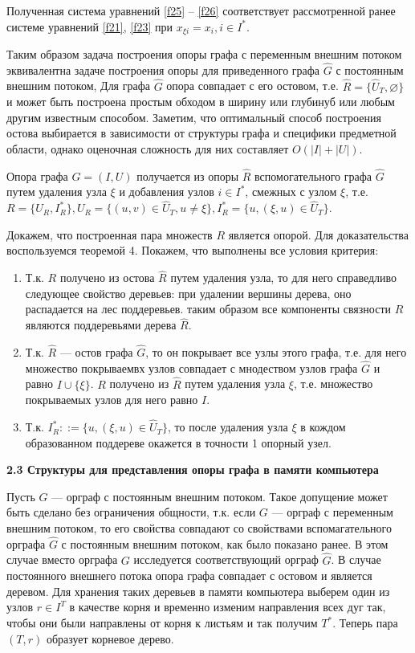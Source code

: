 \documentclass[14pt]{extarticle}%
\begin{document}
Полученная система уравнений \eqref{f25} -- \eqref{f26} соответствует рассмотренной ранее системе уравнений \eqref{f21}, \eqref{f23} при $x_{\xi i}=x_i, i\in I^*$.

Таким образом задача построения опоры графа с переменным внешним потоком эквивалентна задаче построения опоры для приведенного графа $\widehat{G}$ с постоянным внешним потоком, Для графа $\widehat{G}$ опора совпадает с его остовом, т.е. $\widehat{R}=\{\widehat{U}_T,\varnothing\}$ и может быть построена простым обходом в ширину или глубинуб или любым другим известным способом. Заметим, что оптимальный способ построения остова выбирается в зависимости от структуры графа и специфики предметной области, однако оценочная сложность для них составляет $O(|I|+|U|)$.

Опора графа $G=(I,U)$ получается из опоры $\widehat{R}$ вспомогательного графа $\widehat{G}$ путем удаления узла $\xi$ и добавления узлов $i\in I^*$, смежных с узлом $\xi$, т.е. $R=\{U_R, I^*_R\}, U_R=\{(u,v)\in \widehat{U}_T,u\neq \xi\}, I^*_R=\{u,(\xi,u)\in \widehat{U}_T\}$.

Докажем, что построенная пара множеств $R$ является опорой. Для доказательства воспользуемся теоремой 4. Покажем, что выполнены все условия критерия:
\begin{enumerate}
 \item Т.к. $R$ получено из остова $\widehat{R}$ путем удаления узла, то для него справедливо следующее свойство деревьев: при удалении вершины дерева, оно распадается на лес поддеревьев. таким образом все компоненты связности $R$ являются поддеревьями дерева $\widehat{R}$.
 \item Т.к. $\widehat{R}$ --- остов графа $\widehat{G}$, то он покрывает все узлы этого графа, т.е. для него множество покрываемвх узлов совпадает с мнодеством узлов графа $\widehat{G}$ и равно $I\cup \{\xi\}$. $R$ получено из $\widehat{R}$ путем удаления узла $\xi$, т.е. множество покрываемых узлов для него равно $I$.
 \item Т.к. $I^*_R::=\{u,(\xi,u)\in \widehat{U}_T\}$, то после удаления узла $\xi$ в кождом образованном поддереве окажется в точности 1 опорный узел.
 \end{enumerate} 

\textbf{2.3 Структуры для представления опоры графа в памяти компьютера}

Пусть $G$ --- орграф с постоянным внешним потоком. Такое допущение может быть сделано без ограничения общности, т.к. если $G$ --- орграф с переменным внешним потоком, то его свойства совпадают со свойствами вспомагательного орграфа $\widehat{G}$ с постоянным внешним потоком, как было показано ранее. В этом случае вместо орграфа $G$ исследуется соответствующий орграф $\widehat{G}$. В случае постоянного внешнего потока опора графа совпадает с остовом и является деревом. Для хранения таких деревьев в памяти компьютера выберем один из узлов $r\in I^T$ в качестве корня и временно изменим направления всех дуг так, чтобы они были направлены от корня к листьям и так получим $T^*$. Теперь пара $(T,r)$ образует корневое дерево.
\end{document}
